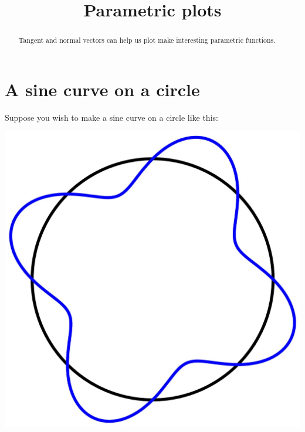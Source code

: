 \documentclass{ximera}
\title[Dig-In:]{Parametric plots}
\begin{document}
\begin{abstract}
  Tangent and normal vectors can help us plot make interesting
  parametric functions.
\end{abstract}
\maketitle

\section{A sine curve on a circle}

Suppose you wish to make a sine curve on a circle like this:
\begin{image}
  \includegraphics{sinOnCircle.jpg}
\end{image}
\end{document}
